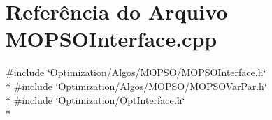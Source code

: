 \section{Referência do Arquivo M\+O\+P\+S\+O\+Interface.\+cpp}
\label{_m_o_p_s_o_interface_8cpp}
{\ttfamily \#include \char`\"{}Optimization/\+Algos/\+M\+O\+P\+S\+O/\+M\+O\+P\+S\+O\+Interface.\+h\char`\"{}}\\*
{\ttfamily \#include \char`\"{}Optimization/\+Algos/\+M\+O\+P\+S\+O/\+M\+O\+P\+S\+O\+Var\+Par.\+h\char`\"{}}\\*
{\ttfamily \#include \char`\"{}Optimization/\+Opt\+Interface.\+h\char`\"{}}\\*
